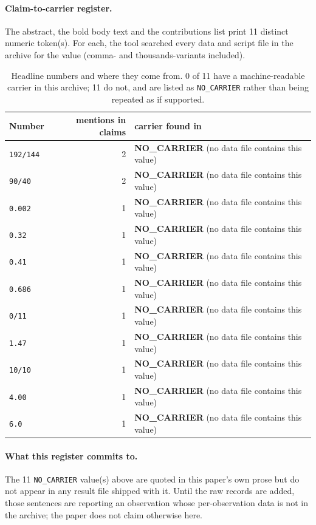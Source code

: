 \paragraph{Claim-to-carrier register.} The abstract, the bold body text and the contributions list print 11 distinct numeric token(s). For each, the tool searched every data and script file in the archive for the value (comma- and thousands-variants included).

\begin{table}[ht]\centering\small
\caption{Headline numbers and where they come from. 0 of 11 have a machine-readable carrier in this archive; 11 do not, and are listed as \texttt{NO\_CARRIER} rather than being repeated as if supported.}
\label{tab:claimcarrier}
\begin{tabular}{lrl}\toprule
Number & mentions in claims & carrier found in \\\midrule
\texttt{192/144} & 2 & \textbf{NO\_CARRIER} (no data file contains this value)
\\
\texttt{90/40} & 2 & \textbf{NO\_CARRIER} (no data file contains this value)
\\
\texttt{0.002} & 1 & \textbf{NO\_CARRIER} (no data file contains this value)
\\
\texttt{0.32} & 1 & \textbf{NO\_CARRIER} (no data file contains this value)
\\
\texttt{0.41} & 1 & \textbf{NO\_CARRIER} (no data file contains this value)
\\
\texttt{0.686} & 1 & \textbf{NO\_CARRIER} (no data file contains this value)
\\
\texttt{0/11} & 1 & \textbf{NO\_CARRIER} (no data file contains this value)
\\
\texttt{1.47} & 1 & \textbf{NO\_CARRIER} (no data file contains this value)
\\
\texttt{10/10} & 1 & \textbf{NO\_CARRIER} (no data file contains this value)
\\
\texttt{4.00} & 1 & \textbf{NO\_CARRIER} (no data file contains this value)
\\
\texttt{6.0} & 1 & \textbf{NO\_CARRIER} (no data file contains this value)
\\
\bottomrule\end{tabular}\end{table}

\paragraph{What this register commits to.} The 11 \texttt{NO\_CARRIER} value(s) above are quoted in this paper's own prose but do not appear in any result file shipped with it. Until the raw records are added, those sentences are reporting an observation whose per-observation data is not in the archive; the paper does not claim otherwise here.

